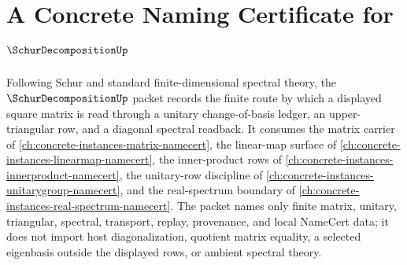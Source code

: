 \chapter{A Concrete Naming Certificate for $\SchurDecompositionUp$}
\label{ch:concrete-instances-schur-decomposition-namecert}

Following Schur and standard finite-dimensional spectral theory, the $\SchurDecompositionUp$ packet records the finite route by which a displayed square matrix is read through a unitary change-of-basis ledger, an upper-triangular row, and a diagonal spectral readback. It consumes the matrix carrier of \autoref{ch:concrete-instances-matrix-namecert}, the linear-map surface of \autoref{ch:concrete-instances-linearmap-namecert}, the inner-product rows of \autoref{ch:concrete-instances-innerproduct-namecert}, the unitary-row discipline of \autoref{ch:concrete-instances-unitarygroup-namecert}, and the real-spectrum boundary of \autoref{ch:concrete-instances-real-spectrum-namecert}. The packet names only finite matrix, unitary, triangular, spectral, transport, replay, provenance, and local NameCert data; it does not import host diagonalization, quotient matrix equality, a selected eigenbasis outside the displayed rows, or ambient spectral theory.

